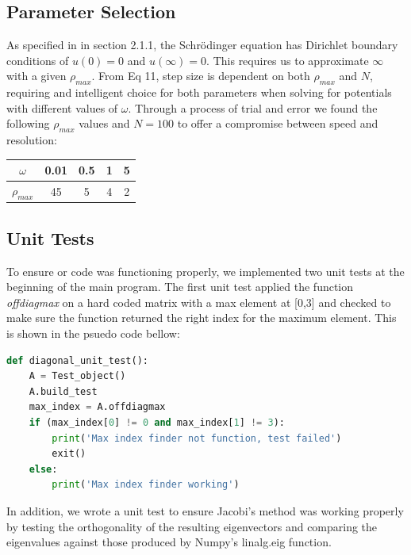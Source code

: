 \documentclass{emulateapj}
\begin{document}
\subsection{Parameter Selection}
As specified in in section 2.1.1, the Schrödinger equation has Dirichlet boundary conditions of $u(0)=0$ and $u(\infty)=0$. This requires us to approximate $\infty$ with a given $\rho_{max}$. From Eq 11, step size is dependent on both $\rho_{max}$ and $N$, requiring and intelligent choice for both parameters when solving for potentials with different values of $\omega$. Through a process of trial and error we found the following $\rho_{max}$ values and $N = 100$ to offer a compromise between speed and resolution:
\begin{center}
\begin{tabular}{ |c|c|c|c|c| }
\hline
$\omega$ & 0.01 & 0.5 & 1 & 5 \\
\hline
$\rho_{max}$ & 45 & 5 & 4 & 2 \\
\hline
\end{tabular}
\end{center}
\subsection{Unit Tests}
To ensure or code was functioning properly, we implemented two unit tests at the beginning of the main program. The first unit test applied the function \textit{offdiagmax} on a hard coded matrix with a max element at [0,3] and checked to make sure the function returned the right index for the maximum element. This is shown in the psuedo code bellow:
\begin{lstlisting}[language=Python]
def diagonal_unit_test():
    A = Test_object()
    A.build_test
    max_index = A.offdiagmax
    if (max_index[0] != 0 and max_index[1] != 3):
        print('Max index finder not function, test failed')
        exit()
    else:
        print('Max index finder working')
\end{lstlisting}
In addition, we wrote a unit test to ensure Jacobi's method was working properly by testing the orthogonality of the resulting eigenvectors and comparing the eigenvalues against those produced by Numpy's linalg.eig function.
\end{document}
